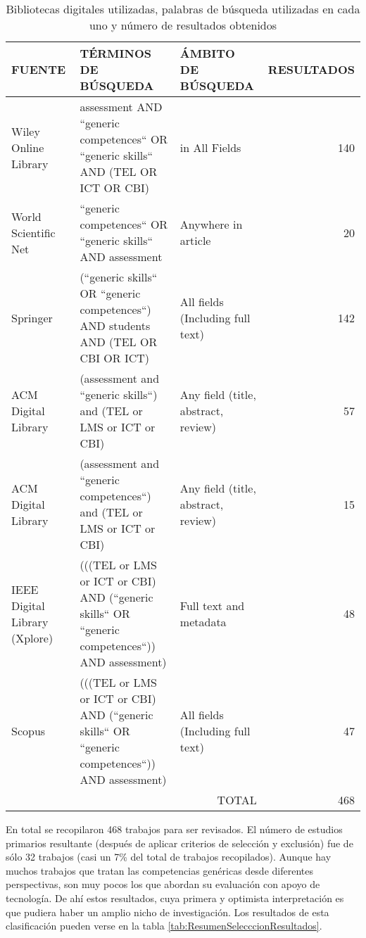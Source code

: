 
\begin{table}[H]
  \begin{center}
  \begin{tabular}{| m{3.5cm} | m{6cm} | m{3cm} | r |}
    \hline
    FUENTE & TÉRMINOS DE BÚSQUEDA & ÁMBITO DE BÚSQUEDA & RESULTADOS \\
    \hline
    \hline
    Wiley Online Library & assessment AND ``generic competences`` OR ``generic skills`` AND (TEL OR ICT OR CBI) & in All Fields & 140 \\
    \hline
    World Scientific Net & ``generic competences`` OR ``generic skills`` AND assessment & Anywhere in article & 20\\
    \hline
    Springer & (``generic skills`` OR ``generic competences``) AND  students AND (TEL OR CBI OR ICT) & All fields (Including full text) & 142\\
    \hline
    ACM Digital Library & (assessment and ``generic skills``) and (TEL or LMS or ICT or CBI) & Any field (title, abstract, review) & 57\\
    \hline
    ACM Digital Library & (assessment and ``generic competences``) and (TEL or LMS or ICT or CBI) & Any field (title, abstract, review) & 15\\
    \hline
    IEEE Digital Library (Xplore) & (((TEL or LMS or ICT or CBI) AND (``generic skills`` OR ``generic competences``)) AND assessment) & Full text and metadata & 48\\
    \hline
    Scopus & (((TEL or LMS or ICT or CBI) AND (``generic skills`` OR ``generic competences``)) AND assessment) & All fields (Including full text) & 47\\
    \hline
    \multicolumn{3}{|r|}{TOTAL} & 468\\
    \hline
  \end{tabular}
\end{center}
\caption{Bibliotecas digitales utilizadas, palabras de búsqueda utilizadas en cada uno y número de resultados obtenidos}
\label{tab:ResumenBusquedaResultados}
\end{table} 



En total se recopilaron 468 trabajos para ser revisados. El número de estudios primarios resultante (después de aplicar criterios de selección y exclusión) fue de sólo 32 trabajos (casi un 7\% del total de trabajos recopilados). Aunque hay muchos trabajos que tratan las competencias genéricas desde diferentes perspectivas, son muy pocos los que abordan su evaluación con apoyo de tecnología. De ahí estos resultados, cuya primera y optimista interpretación es que pudiera haber un amplio nicho de investigación. Los resultados de esta clasificación pueden verse en la tabla \ref{tab:ResumenSelecccionResultados}.

